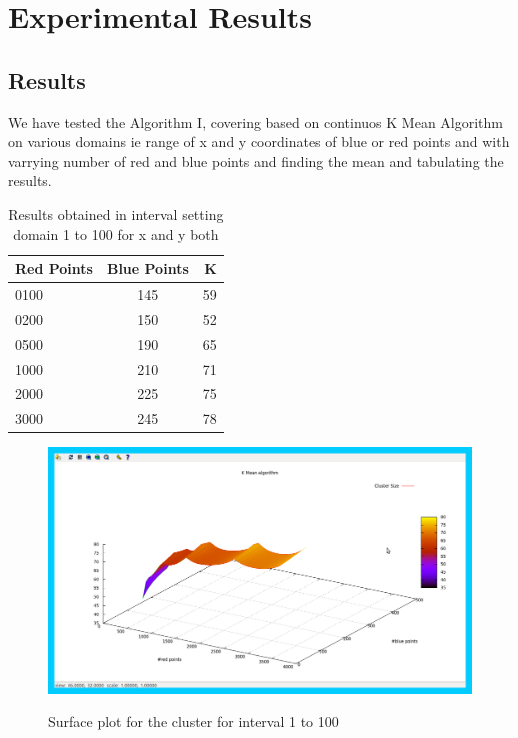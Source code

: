 \documentclass[12pt,a4wide]{report}
\theoremstyle{plain}
\theoremstyle{definition}
\theoremstyle{remark}
\begin{document}
\chapter{Experimental Results}
\section{Results} 
We have tested the Algorithm I, covering based on continuos K Mean Algorithm on various domains ie range of x and y 
coordinates of blue or red points and with varrying number of red and blue points and 
finding the mean and tabulating the results.
\begin{table}[H]
\centering
\vspace{2ex}
\caption{Results obtained in interval setting domain 1 to 100 for x and y both}
 \begin{tabular}{||l|c|r||} \hline
 Red Points & Blue Points & K \\ \hline
 0100 & 145 & 59 \\ \hline
 0200 & 150 & 52 \\ \hline
 0500 & 190 & 65 \\ \hline
 1000 & 210 & 71 \\ \hline
 2000 & 225 & 75 \\ \hline
 3000 & 245 & 78 \\ \hline
\end{tabular}
\end{table}
\begin{figure}[H]
 \caption{Surface plot for the cluster for interval 1 to 100}
  \centering
\scalebox{0.3}
{\includegraphics{avg100h.png}}
\end{figure}
\end{document}
